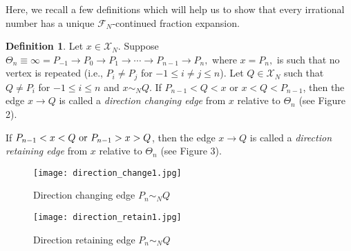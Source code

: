 \documentclass[12pt]{elsarticle}
\theoremstyle{definition}
\newtheorem{defi}{Definition}
\newcommand{\mX}{{\mathcal X}}
\newcommand{\f}{{\mathcal F}}
\newcommand{\ep}{\epsilon}
\begin{document}
	
Here, we recall a few definitions which will help us to show that every irrational number has a unique $\f_N$-continued fraction expansion.
 	 \begin{defi} Let $x\in\mX_N.$ Suppose $\Theta_n\equiv\infty=P_{-1}\to P_0\to P_1\to\cdots\to P_{n-1}\to P_n,$ where $x=P_n,$ is such that no vertex is repeated (i.e., $P_i\ne P_j$ for $-1\le i\ne j\le n$).  
	 Let $Q\in \mX_N$ such that $Q\ne P_i$ for $-1\le i\le n$ and $x\sim_N Q$. 
  	   If $P_{n-1}<Q<x$ or $x<Q<P_{n-1}$, then the edge $x\to Q$ is called a {\it direction changing edge} from $x$ relative to $\Theta_n$ (see Figure 2). 
  	 
  If $P_{n-1}<x<Q \textnormal{ or } P_{n-1}>x>Q$, then the edge $x\to Q$ is called a {\it direction retaining edge} from $x$ relative to $\Theta_n$ (see Figure 3).
  		
  	\end{defi}
  	  \begin{figure}[h!]
  	 	\centering
  	 	\texttt{[image: direction\_change1.jpg]}\caption{Direction changing edge $P_n\sim_N Q$}
  	 \end{figure}   
  	 \begin{figure}[h!]
  	 	\centering
  	 	  	 	\texttt{[image: direction\_retain1.jpg]}
  	 	\caption{Direction retaining edge $P_n\sim_N Q$}		
  	 \end{figure}
%  	
%  
  	
\end{document}
